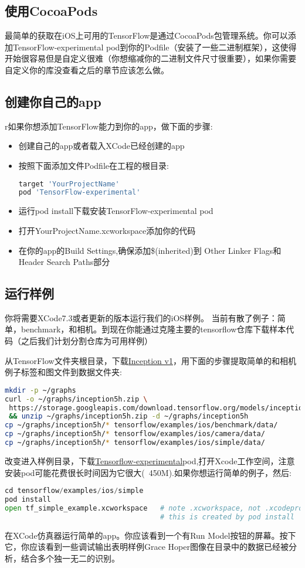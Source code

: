 \subsection{使用CocoaPods}
最简单的获取在iOS上可用的TensorFlow是通过CocoaPods包管理系统。你可以添加TensorFlow-experimental pod到你的Podfile（安装了一些二进制框架），这使得开始很容易但是自定义很难（你想缩减你的二进制文件尺寸很重要），如果你需要自定义你的库没查看之后的章节应该怎么做。
\subsection{创建你自己的app}
r如果你想添加TensorFlow能力到你的app，做下面的步骤:
\begin{itemize}
\item 创建自己的app或者载入XCode已经创建的app
\item 按照下面添加文件Podfile在工程的根目录:
\begin{lstlisting}[language=Bash]
target 'YourProjectName'
pod 'TensorFlow-experimental'
\end{lstlisting}
\item 运行pod install下载安装TensorFlow-experimental pod 
\item 打开YourProjectName.xcworkspace添加你的代码
\item 在你的app的Build Settings,确保添加\$(inherited)到 Other Linker Flags和Header Search Paths部分
\end{itemize}
\subsection{运行样例}
你将需要XCode7.3或者更新的版本运行我们的iOS样例。
当前有散了例子：简单，benchmark，和相机。到现在你能通过克隆主要的tensorflow仓库下载样本代码（之后我们计划分割仓库为可用样例）

从TensorFlow文件夹根目录，下载\href{https://storage.googleapis.com/download.tensorflow.org/models/inception5h.zip}{Inception v1}，用下面的步骤提取简单的和相机例子标签和图文件到数据文件夹:
\begin{lstlisting}[language=Bash]
mkdir -p ~/graphs
curl -o ~/graphs/inception5h.zip \
 https://storage.googleapis.com/download.tensorflow.org/models/inception5h.zip \
 && unzip ~/graphs/inception5h.zip -d ~/graphs/inception5h
cp ~/graphs/inception5h/* tensorflow/examples/ios/benchmark/data/
cp ~/graphs/inception5h/* tensorflow/examples/ios/camera/data/
cp ~/graphs/inception5h/* tensorflow/examples/ios/simple/data/
\end{lstlisting}
改变进入样例目录，下载\href{https://cocoapods.org/pods/TensorFlow-experimental}{Tensorflow-experimental}pod,打开Xcode工作空间，注意安装pod可能花费很长时间因为它很大(~450M).如果你想运行简单的例子，然后:
\begin{lstlisting}[language=Python]
cd tensorflow/examples/ios/simple
pod install
open tf_simple_example.xcworkspace   # note .xcworkspace, not .xcodeproj
                                     # this is created by pod install
\end{lstlisting}
在XCode仿真器运行简单的app。你应该看到一个有Run Model按钮的屏幕。按下它，你应该看到一些调试输出表明样例Grace Hoper图像在目录中的数据已经被分析，结合多个独一无二的识别。

